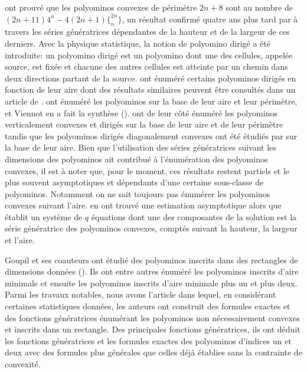   \cite{De-Vi} ont prouvé que les polyominos convexes de périmètre $2n+8$ sont au nombre de $(2n+11)4^{n}-4(2n+1)\{_{n}^{2n}\}$, un résultat confirmé quatre ans plus tard par \cite{Ch-Li} à travers les séries génératrices dépendantes  de la hauteur et de la largeur de ces derniers. Avec la physique statistique, la notion de polyomino dirigé a été introduite: un polyomino dirigé est  un polyomino dont une des cellules, appelée source, est fixée et chacune des autres cellules est atteinte par un chemin dans deux directions partant de la source.
 \cite{DE-Na-Va}  ont énuméré  certains polyominos  dirigés en fonction de leur aire dont des résultats similaires peuvent être consultés dans un article  de \cite{Ha-Na}. \cite{Go-Vi} ont énuméré les polyominos sur la base de leur aire et leur périmètre, et Viennot en a fait la synthèse   (\cite{Vie1}). \cite{De-Du} ont de leur côté énuméré les polyominos verticalement convexes et dirigés sur la base de leur aire et de leur périmètre  tandis que  les polyominos dirigés diagonalement convexes ont été étudiés par \cite{Pr-Sv} sur la base de leur aire. Bien que l'utilisation des séries génératrices suivant les dimensions des polyominos ait contribué à l'énumération des polyominos convexes, il est à noter que, pour le moment, ces résultats restent partiels et le plus souvent asymptotiques et dépendants d'une certaine sous-classe de polyominos. Notamment on ne sait toujours pas énumérer
les polyominos convexes suivant l’aire.  \cite{K1-Ri1} en ont trouvé une estimation asymptotique alors que \cite{Bos1} établit un système de $q$ équations dont une des
composantes de la solution est la série génératrice des polyominos
convexes, comptés suivant la hauteur, la largeur et l’aire.


 Goupil et ses coauteurs ont étudié des polyominos inscrits dans des rectangles de dimensions données (\cite{Goup2}). Ils ont entre autres énuméré les  polyominos inscrits d'aire minimale et ensuite les polyominos inscrits d'aire minimale plus un et plus deux. %
Parmi les travaux notables, nous avons l'article \cite{Goup3} dans lequel, en  considérant certaines statistiques données, les auteurs ont construit des formules exactes et des fonctions génératrices énumérant les polyominos non nécessairement convexes et inscrits dans un rectangle. Des principales fonctions génératrices, ils ont déduit les fonctions génératrices et les formules exactes des polyominos  d'indices un et deux avec des formules plus générales que celles déjà établies sans la contrainte de convexité.
 


